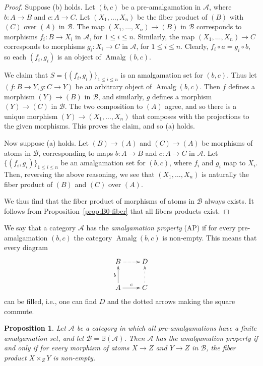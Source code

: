 \documentclass[12pt]{amsart}
\numberwithin{equation}{section}
\newtheorem{proposition}[equation]{Proposition}
\theoremstyle{definition}
\newcommand{\cA}{\mathcal{A}}
\newcommand{\cB}{\mathcal{B}}
\newcommand{\defn}[1]{\emph{#1}}
\newcommand{\BB}{\mathbb{B}}
\DeclareMathOperator{\Amalg}{Amalg}
\begin{document}
\begin{proof}
Suppose (b) holds. Let $(b,c)$ be a pre-amalgamation in $\cA$, where $b \colon A \to B$ and $c \colon A \to C$. Let $(X_1, \ldots, X_n)$ be the fiber product of $(B)$ with $(C)$ over $(A)$ in $\cB$. The map $(X_1, \ldots, X_n) \to (B)$ in $\cB$ corresponds to morphisms $f_i \colon B \to X_i$ in $\cA$, for $1 \le i \le n$. Similarly, the map $(X_1, \ldots, X_n) \to C$ corresponds to morphisms $g_i \colon X_i \to C$ in $\cA$, for $1 \le i \le n$. Clearly, $f_i \circ a = g_i \circ b$, so each $(f_i, g_i)$ is an object of $\Amalg(b,c)$.

We claim that $S=\{(f_i,g_i)\}_{1 \le i \le n}$ is an amalgamation set for $(b,c)$. Thus let $(f \colon B \to Y, g \colon C \to Y)$ be an arbitrary object of $\Amalg(b,c)$. Then $f$ defines a morphism $(Y) \to (B)$ in $\cB$, and similarly, $g$ defines a morphism $(Y) \to (C)$ in $\cB$. The two composition to $(A)$ agree, and so there is a unique morphism $(Y) \to (X_1, \ldots, X_n)$ that composes with the projections to the given morphisms. This proves the claim, and so (a) holds.

Now suppose (a) holds. Let $(B) \to (A)$ and $(C) \to (A)$ be morphisms of atoms in $\cB$, corresponding to maps $b \colon A \to B$ and $c \colon A \to C$ in $\cA$. Let $\{(f_i, g_i)\}_{1 \le i \le n}$ be an amalgamation set for $(b,c)$, where $f_i$ and $g_i$ map to $X_i$. Then, reversing the above reasoning, we see that $(X_1, \ldots, X_n)$ is naturally the fiber product of $(B)$ and $(C)$ over $(A)$.

We thus find that the fiber product of morphisms of atoms in $\cB$ always exists. It follows from Proposition~\ref{prop:B0-fiber} that all fibers products exist.
\end{proof}

We say that a category $\cA$ has the \defn{amalgamation property} (AP) if for every pre-amalgamation $(b,c)$ the category $\Amalg(b,c)$ is non-empty. This means that every diagram
\begin{displaymath}
\xymatrix{
B \ar@{..>}[r] & D \\
A \ar[u]^b \ar[r]^c & C \ar@{..>}[u] }
\end{displaymath}
can be filled, i.e., one can find $D$ and the dotted arrows making the square commute.

\begin{proposition} \label{prop:amalg2}
Let $\cA$ be a category in which all pre-amalgamations have a finite amalgamation set, and let $\cB=\BB(\cA)$. Then $\cA$ has the amalgamation property if and only if for every morphism of atoms $X \to Z$ and $Y \to Z$ in $\cB$, the fiber product $X \times_Z Y$ is non-empty.
\end{proposition}
\end{document}
